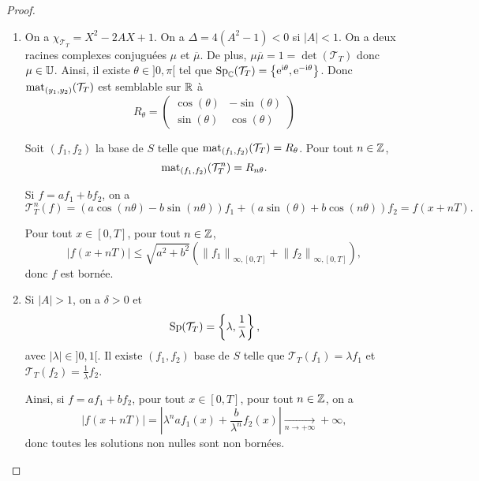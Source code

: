 \documentclass[12pt]{article}
\begin{document}
\begin{proof}
\begin{enumerate}
		\item On a $\chi_{\mathcal{T}_T}=X^{2}-2AX+1$. On a $\Delta=4(A^{2}-1)<0$ si $\left\lvert A\right\rvert<1$. On a deux racines complexes conjuguées $\mu$ et $\overline{\mu}$. De plus, $\mu\overline{\mu}=1=\det(\mathcal{T}_T)$ donc $\mu\in\mathbb{U}$. Ainsi, il existe $\theta\in]0,\pi[$ tel que $\operatorname{Sp}_{\mathbb{C}}(\mathcal{T}_T)=\left\lbrace\mathrm{e}^{\mathrm{i}\theta},\mathrm{e}^{-\mathrm{i}\theta}\right\rbrace$. Donc $\operatorname{mat}_{(y_1,y_2)}(\mathcal{T}_T)$ est semblable sur $\mathbb{R}$ à
		\begin{equation*}
			R_{\theta}=\begin{pmatrix}
				\cos(\theta) & -\sin(\theta)\\
				\sin(\theta) & \cos(\theta)
			\end{pmatrix}
		\end{equation*}

		Soit $(f_1,f_2)$ la base de $S$ telle que $\operatorname{mat}_{(f_1,f_2)}(\mathcal{T}_{T})=R_{\theta}$. Pour tout $n\in\mathbb{Z}$, 
		\begin{equation*}
			\operatorname{mat}_{(f_1,f_2)}(\mathcal{T}_{T}^{n})=R_{n\theta}.
		\end{equation*}

		Si $f=af_1+bf_2$, on a 
		\begin{equation*}
			\mathcal{T}_T^{n}(f)=(a\cos(n\theta)-b\sin(n\theta))f_1+(a\sin(\theta)+b\cos(n\theta))f_2=f(x+nT).
		\end{equation*}

		Pour tout $x\in[0,T]$, pour tout $n\in\mathbb{Z}$,
		\begin{equation*}
			\left\lvert f(x+nT)\right\rvert\leqslant
			\sqrt{a^{2}+b^{2}}
			\left(\left\lVert f_{1}\right\rVert_{\infty,[0,T]}+\left\lVert f_2\right\rVert_{\infty,[0,T]}\right),
		\end{equation*}
		donc $f$ est bornée.

		\item Si $\left\lvert A\right\rvert>1$, on a $\delta>0$ et 
		\begin{equation*}
			\operatorname{Sp}(\mathcal{T}_T)=\left\lbrace\lambda,\frac{1}{\lambda}\right\rbrace,
		\end{equation*}
		avec $\left\lvert\lambda\right\rvert\in]0,1[$. Il existe $(f_1,f_2)$ base de $S$ telle que $\mathcal{T}_{T}(f_1)=\lambda f_1$ et $\mathcal{T}_{T}(f_2)=\frac{1}{\lambda}f_2$. 

		Ainsi, si $f=af_1+bf_2$, pour tout $x\in[0,T]$, pour tout $n\in\mathbb{Z}$, on a 
		\begin{equation*}
			\left\lvert f(x+nT)\right\rvert=\left\lvert \lambda^{n}af_1(x)+\frac{b}{\lambda^{n}}f_2(x)\right\rvert\xrightarrow[n\to+\infty]{}+\infty,
		\end{equation*}
		donc toutes les solutions non nulles sont non bornées.


\end{enumerate}
\end{proof}
\end{document}
